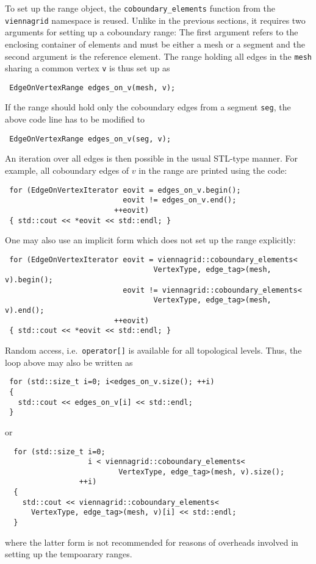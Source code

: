 To set up the range object, the \lstinline|coboundary_elements| function from the \lstinline|viennagrid| namespace is reused. Unlike in the previous sections, it requires two arguments
for setting up a coboundary range: The first argument refers to the enclosing container of elements and must be either a mesh or a segment and the second argument is the reference element.
The range holding all edges in the \lstinline|mesh| sharing a common vertex \lstinline|v| is thus set up as
\begin{lstlisting}
 EdgeOnVertexRange edges_on_v(mesh, v);
\end{lstlisting}

If the range should hold only the coboundary edges from a segment \lstinline|seg|, the above code line has to be modified to
\begin{lstlisting}
 EdgeOnVertexRange edges_on_v(seg, v);
\end{lstlisting}

An iteration over all edges is then possible in the usual STL-type manner. For example, all coboundary edges of $v$ in the range are printed using the code:
\begin{lstlisting}
 for (EdgeOnVertexIterator eovit = edges_on_v.begin();
                           eovit != edges_on_v.end();
                         ++eovit)
 { std::cout << *eovit << std::endl; }
\end{lstlisting}
One may also use an implicit form which does not set up the range explicitly:
\begin{lstlisting}
 for (EdgeOnVertexIterator eovit = viennagrid::coboundary_elements<
                                  VertexType, edge_tag>(mesh, v).begin();
                           eovit != viennagrid::coboundary_elements<
                                  VertexType, edge_tag>(mesh, v).end();
                         ++eovit)
 { std::cout << *eovit << std::endl; }
\end{lstlisting}

Random access, i.e.~\lstinline|operator[]| is available for all topological levels. Thus, the loop above may also be written as
\begin{lstlisting}
 for (std::size_t i=0; i<edges_on_v.size(); ++i)
 {
   std::cout << edges_on_v[i] << std::endl;
 }
\end{lstlisting}
or
\begin{lstlisting}
  for (std::size_t i=0;
                   i < viennagrid::coboundary_elements<
                          VertexType, edge_tag>(mesh, v).size();
                 ++i)
  {
    std::cout << viennagrid::coboundary_elements<
      VertexType, edge_tag>(mesh, v)[i] << std::endl;
  }
\end{lstlisting}
where the latter form is not recommended for reasons of overheads involved in setting up the tempoarary ranges.

